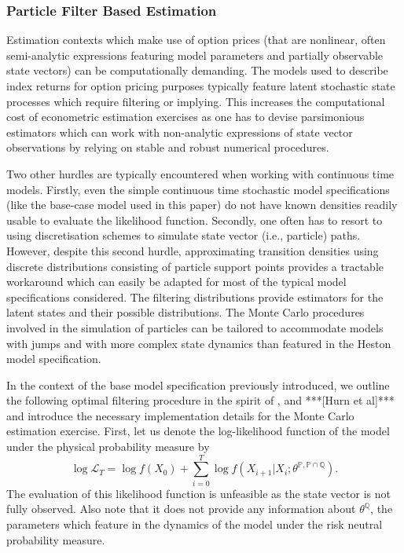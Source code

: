 \documentclass[11pt,a4paper,notitlepage]{article}
\numberwithin{equation}{section}
\begin{document}
\subsubsection{Particle Filter Based Estimation}
Estimation contexts which make use of option prices (that are nonlinear, often semi-analytic expressions featuring model parameters and partially observable state vectors) can be computationally demanding. The models used to describe index returns for option pricing purposes typically feature latent stochastic state processes which require filtering  or implying. This increases the computational cost of econometric estimation exercises as one has to devise parsimonious estimators which can work with non-analytic expressions of state vector observations by relying on stable and robust numerical procedures. 


Two other hurdles are typically encountered when working with continuous time models. Firstly, even the simple continuous time stochastic model specifications (like the base-case model used in this paper) do not have known densities readily usable to evaluate the likelihood function. Secondly, one often has to resort to using discretisation schemes to simulate state vector (i.e., particle) paths. However, despite this second hurdle, approximating transition densities using discrete distributions consisting of particle support points provides a tractable workaround which can easily be adapted for most of the typical model specifications considered. The filtering distributions provide estimators for the latent states and their possible distributions. The Monte Carlo procedures involved in the simulation of particles can be tailored to accommodate models with jumps and with more complex state dynamics than featured in the Heston model specification. 

In the context of the base model specification previously introduced, we outline the following optimal filtering procedure in the spirit of \citet{johannes2009optimal}, \citet{christoffersen2010volatility} and ***[Hurn et al]*** and introduce the necessary implementation details for the Monte Carlo estimation exercise. First, let us denote the  log-likelihood function of the model under the physical probability measure by
\begin{equation}
\log \mathcal{L}_T = \log f(X_0) + \sum_{i=0}^T \log f(X_{i+1}|X_{i};\theta^{\mathbb{P},\mathbb{P}\cap\mathbb{Q}}).
\end{equation}
The evaluation of this likelihood function is unfeasible as the state vector is not fully observed. Also note that it does not provide any information about $\theta^\mathbb{Q}$, the parameters which feature in the dynamics of the model under the risk neutral probability measure.
 
\end{document}
